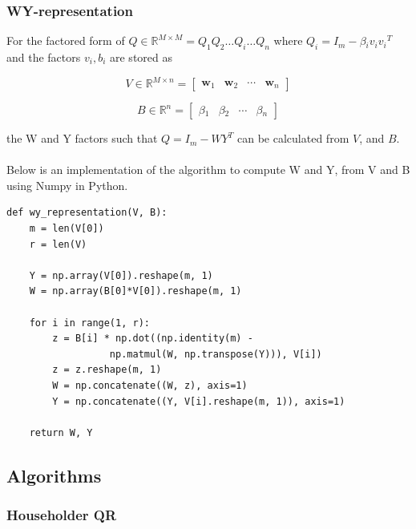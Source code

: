 \documentclass{article}
\begin{document}
\subsubsection{WY-representation}

For the factored form of $Q \in \mathbb{R}^{M \times M} = {Q_1}{Q_2}{\dots}{Q_i}{\dots}{Q_n}$ where $Q_i = {I_m} - {\beta{}_i}{v_i}{v_i}^T$ and the factors ${v_i, b_i}$ are stored as  

\begin{equation}
V \in \mathbb{R}^{M \times n} =
\begin{bmatrix}
\mathbf{w}_1 & \mathbf{w}_2 & \cdots & \mathbf{w}_{n}
\end{bmatrix}
\end{equation}

\begin{equation}
B \in \mathbb{R}^{n} = 
\begin{bmatrix}
\beta{}_1 & \beta{}_2 & \cdots & \beta{}_{n}
\end{bmatrix}
\end{equation}

 the W and Y factors such that $Q = I_m - {W}{Y}^T$ can be calculated from $V$, and $B$.

\paragraph{}
Below is an implementation of the algorithm to compute W and Y, from V and B using Numpy in Python.

\begin{lstlisting}
def wy_representation(V, B):
    m = len(V[0])
    r = len(V)

    Y = np.array(V[0]).reshape(m, 1)
    W = np.array(B[0]*V[0]).reshape(m, 1)

    for i in range(1, r):
        z = B[i] * np.dot((np.identity(m) - 
			      np.matmul(W, np.transpose(Y))), V[i])
        z = z.reshape(m, 1)
        W = np.concatenate((W, z), axis=1)
        Y = np.concatenate((Y, V[i].reshape(m, 1)), axis=1)
    
    return W, Y
\end{lstlisting}

\subsection{Algorithms}
\subsubsection{Householder QR}
\end{document}
